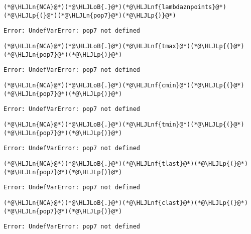 \documentclass[12pt,a4paper]{article}
\newcommand{\HLJLn}[1]{#1}
\newcommand{\HLJLnf}[1]{\textcolor[RGB]{66,102,213}{#1}}
\newcommand{\HLJLoB}[1]{\textcolor[RGB]{102,102,102}{\textbf{#1}}}
\newcommand{\HLJLp}[1]{#1}
\begin{document}
\begin{lstlisting}
(*@\HLJLn{NCA}@*)(*@\HLJLoB{.}@*)(*@\HLJLnf{lambdaznpoints}@*)(*@\HLJLp{(}@*)(*@\HLJLn{pop7}@*)(*@\HLJLp{)}@*)
\end{lstlisting}

\begin{lstlisting}
Error: UndefVarError: pop7 not defined
\end{lstlisting}


\begin{lstlisting}
(*@\HLJLn{NCA}@*)(*@\HLJLoB{.}@*)(*@\HLJLnf{tmax}@*)(*@\HLJLp{(}@*)(*@\HLJLn{pop7}@*)(*@\HLJLp{)}@*)
\end{lstlisting}

\begin{lstlisting}
Error: UndefVarError: pop7 not defined
\end{lstlisting}


\begin{lstlisting}
(*@\HLJLn{NCA}@*)(*@\HLJLoB{.}@*)(*@\HLJLnf{cmin}@*)(*@\HLJLp{(}@*)(*@\HLJLn{pop7}@*)(*@\HLJLp{)}@*)
\end{lstlisting}

\begin{lstlisting}
Error: UndefVarError: pop7 not defined
\end{lstlisting}


\begin{lstlisting}
(*@\HLJLn{NCA}@*)(*@\HLJLoB{.}@*)(*@\HLJLnf{tmin}@*)(*@\HLJLp{(}@*)(*@\HLJLn{pop7}@*)(*@\HLJLp{)}@*)
\end{lstlisting}

\begin{lstlisting}
Error: UndefVarError: pop7 not defined
\end{lstlisting}


\begin{lstlisting}
(*@\HLJLn{NCA}@*)(*@\HLJLoB{.}@*)(*@\HLJLnf{tlast}@*)(*@\HLJLp{(}@*)(*@\HLJLn{pop7}@*)(*@\HLJLp{)}@*)
\end{lstlisting}

\begin{lstlisting}
Error: UndefVarError: pop7 not defined
\end{lstlisting}


\begin{lstlisting}
(*@\HLJLn{NCA}@*)(*@\HLJLoB{.}@*)(*@\HLJLnf{clast}@*)(*@\HLJLp{(}@*)(*@\HLJLn{pop7}@*)(*@\HLJLp{)}@*)
\end{lstlisting}

\begin{lstlisting}
Error: UndefVarError: pop7 not defined
\end{lstlisting}
\end{document}

